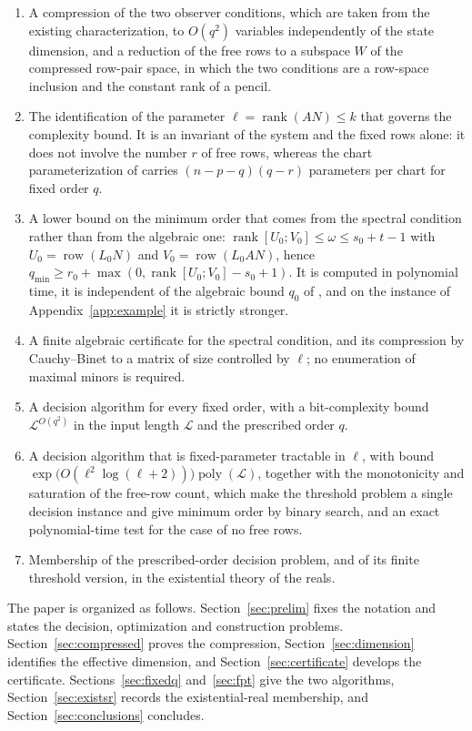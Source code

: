 \documentclass[journal]{IEEEtran}
\theoremstyle{plainn}
\theoremstyle{remark}
\begin{document}
\begin{enumerate}
\item A compression of the two observer conditions, which are taken from the existing
characterization, to $O(q^2)$ variables independently of the state dimension, and a
reduction of the free rows to a subspace $W$ of the compressed row-pair space, in which the
two conditions are a row-space inclusion and the constant rank of a pencil.
\item The identification of the parameter $\ell=\operatorname{rank}(AN)\le k$ that governs
the complexity bound. It is an invariant of the system and the fixed rows alone: it does not
involve the number $r$ of free rows, whereas the chart parameterization of \cite{fer26b}
carries $(n-p-q)(q-r)$ parameters per chart for fixed order $q$.
\item A lower bound on the minimum order that comes from the spectral condition rather than
from the algebraic one: $\operatorname{rank}[U_0;V_0]\le\omega\le s_0+t-1$ with $U_0=\operatorname{row}(L_0N)$
and $V_0=\operatorname{row}(L_0AN)$, hence
$q_{\min}\ge r_0+\max(0,\operatorname{rank}[U_0;V_0]-s_0+1)$. It is computed in polynomial time,
it is independent of the algebraic bound $q_0$ of \cite{fer26a,fer26b}, and on the instance of
Appendix~\ref{app:example} it is strictly stronger.
\item A finite algebraic certificate for the spectral condition, and its compression by
Cauchy--Binet to a matrix of size controlled by $\ell$; no enumeration of maximal minors is
required.
\item A decision algorithm for every fixed order, with a bit-complexity bound
$\mathcal L^{O(q^2)}$ in the input length $\mathcal L$ and the prescribed order $q$.
\item A decision algorithm that is fixed-parameter tractable in $\ell$, with bound
$\exp\bigl(O(\ell^2\log(\ell+2))\bigr)\operatorname{poly}(\mathcal L)$, together with the
monotonicity and saturation of the free-row count, which make the threshold problem a single
decision instance and give minimum order by binary search, and an exact polynomial-time test
for the case of no free rows.
\item Membership of the prescribed-order decision problem, and of its finite threshold
version, in the existential theory of the reals.
\end{enumerate}

The paper is organized as follows. Section~\ref{sec:prelim} fixes the notation and states
the decision, optimization and construction problems. Section~\ref{sec:compressed} proves
the compression, Section~\ref{sec:dimension} identifies the effective dimension, and
Section~\ref{sec:certificate} develops the certificate. Sections~\ref{sec:fixedq}
and~\ref{sec:fpt} give the two algorithms, Section~\ref{sec:existsr} records the
existential-real membership, and Section~\ref{sec:conclusions} concludes.
\end{document}
